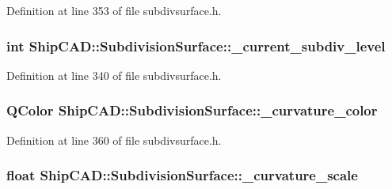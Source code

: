 Definition at line 353 of file subdivsurface.\-h.

\hypertarget{classShipCAD_1_1SubdivisionSurface_a9e5424746eced5d0a06ccbe4055bd06f}{
\subsubsection[{\-\_\-current\-\_\-subdiv\-\_\-level}]{\setlength{\rightskip}{0pt plus 5cm}int Ship\-C\-A\-D\-::\-Subdivision\-Surface\-::\-\_\-current\-\_\-subdiv\-\_\-level\hspace{0.3cm}{\ttfamily [protected]}}}\label{classShipCAD_1_1SubdivisionSurface_a9e5424746eced5d0a06ccbe4055bd06f}


Definition at line 340 of file subdivsurface.\-h.

\hypertarget{classShipCAD_1_1SubdivisionSurface_a05a83d21996abb065abe7f3109f35a73}{
\subsubsection[{\-\_\-curvature\-\_\-color}]{\setlength{\rightskip}{0pt plus 5cm}Q\-Color Ship\-C\-A\-D\-::\-Subdivision\-Surface\-::\-\_\-curvature\-\_\-color\hspace{0.3cm}{\ttfamily [protected]}}}\label{classShipCAD_1_1SubdivisionSurface_a05a83d21996abb065abe7f3109f35a73}


Definition at line 360 of file subdivsurface.\-h.

\hypertarget{classShipCAD_1_1SubdivisionSurface_acf241b41a8ca897306decbbab8e44c69}{
\subsubsection[{\-\_\-curvature\-\_\-scale}]{\setlength{\rightskip}{0pt plus 5cm}float Ship\-C\-A\-D\-::\-Subdivision\-Surface\-::\-\_\-curvature\-\_\-scale\hspace{0.3cm}{\ttfamily [protected]}}}\label{classShipCAD_1_1SubdivisionSurface_acf241b41a8ca897306decbbab8e44c69}


